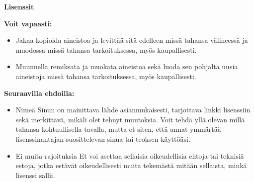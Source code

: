 
\pagestyle{empty}

{\large\textbf{Lisenssit}}



\textbf{Voit vapaasti:}
\begin{itemize}
  \item Jakaa {\textemdash} kopioida aineistoa ja levittää sitä edelleen missä tahansa välineessä ja muodossa missä tahansa tarkoituksessa, myös kaupallisesti.
  \item Muunnella {\textemdash} remiksata ja muokata aineistoa sekä luoda sen pohjalta uusia aineistoja missä tahansa tarkoituksessa, myös kaupallisesti.
\end{itemize}

\textbf{Seuraavilla ehdoilla:}
\begin{itemize}
  \item Nimeä {\textemdash} Sinun on mainittava lähde asianmukaisesti, tarjottava linkki lisenssiin sekä merkittävä, mikäli olet tehnyt muutoksia. Voit tehdä yllä olevan millä tahansa kohtuullisella tavalla, mutta et siten, että annat ymmärtää lisenssinantajan suosittelevan sinua tai teoksen käyttöäsi.
  \item Ei muita rajoituksia {\textemdash} Et voi asettaa sellaisia oikeudellisia ehtoja tai teknisiä estoja, jotka estävät oikeudellisesti muita tekemästä mitään sellaista, minkä lisenssi sallii.
\end{itemize}

\restoregeometry
\clearpage
